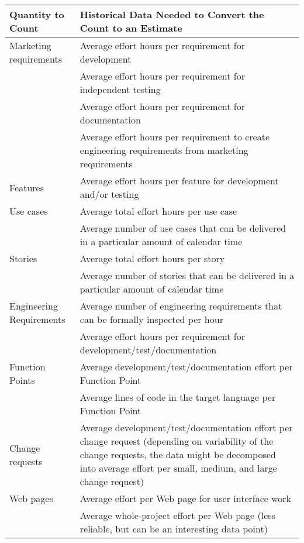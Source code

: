 \documentclass[a4paper]{article}
\begin{document}
\begin{multicols}{3}
  \begin{tabular}{l|l}
  Quantity to Count             & Historical Data Needed to Convert the Count to an Estimate \\\hline
  Marketing requirements        & Average effort hours per requirement for development \\
                                & Average effort hours per requirement for independent testing  \\
                                & Average effort hours per requirement for documentation  \\
                                & Average effort hours per requirement to create engineering requirements from marketing requirements  \\
  Features                      & Average effort hours per feature for development and/or testing \\
  Use cases                     & Average total effort hours per use case  \\
                                & Average number of use cases that can be delivered in a particular amount of calendar time  \\
  Stories                       & Average total effort hours per story  \\
                                & Average number of stories that can be delivered in a particular amount of calendar time  \\
  Engineering Requirements      & Average number of engineering requirements that can be formally inspected per hour  \\
                                & Average effort hours per requirement for development/test/documentation  \\
  Function Points               & Average development/test/documentation effort per Function Point  \\
                                & Average lines of code in the target language per Function Point  \\
  Change requests               & Average development/test/documentation effort per change request (depending on variability of the change requests, the data might be decomposed into average effort per small, medium, and large change request)  \\
  Web pages                     & Average effort per Web page for user interface work  \\
                                & Average whole-project effort per Web page (less reliable, but can be an interesting data point)  \\

\end{tabular}
\end{multicols}
\end{document}
